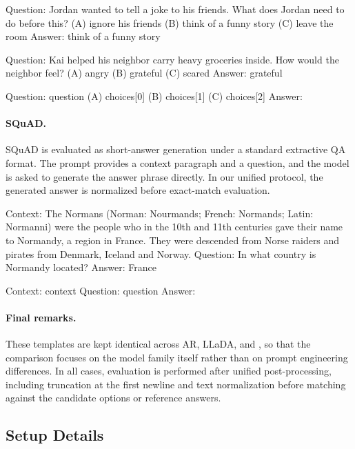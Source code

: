 \begin{promptbox}
Question: Jordan wanted to tell a joke to his friends. What does Jordan need to do before this?
(A) ignore his friends
(B) think of a funny story
(C) leave the room
Answer: think of a funny story

Question: Kai helped his neighbor carry heavy groceries inside. How would the neighbor feel?
(A) angry
(B) grateful
(C) scared
Answer: grateful

Question: {question}
(A) {choices[0]}
(B) {choices[1]}
(C) {choices[2]}
Answer:
\end{promptbox}

\paragraph{SQuAD.}
SQuAD is evaluated as short-answer generation under a standard extractive QA format. The prompt provides a context paragraph and a question, and the model is asked to generate the answer phrase directly. In our unified protocol, the generated answer is normalized before exact-match evaluation.

\begin{promptbox}
Context: The Normans (Norman: Nourmands; French: Normands; Latin: Normanni) were the people who in the 10th and 11th centuries gave their name to Normandy, a region in France. They were descended from Norse raiders and pirates from Denmark, Iceland and Norway.
Question: In what country is Normandy located?
Answer: France

Context: {context}
Question: {question}
Answer:
\end{promptbox}

\paragraph{Final remarks.}
These templates are kept identical across AR, LLaDA, and \method, so that the comparison focuses on the model family itself rather than on prompt engineering differences. In all cases, evaluation is performed after unified post-processing, including truncation at the first newline and text normalization before matching against the candidate options or reference answers.

\subsection{Setup Details}
\label{app:setup}

